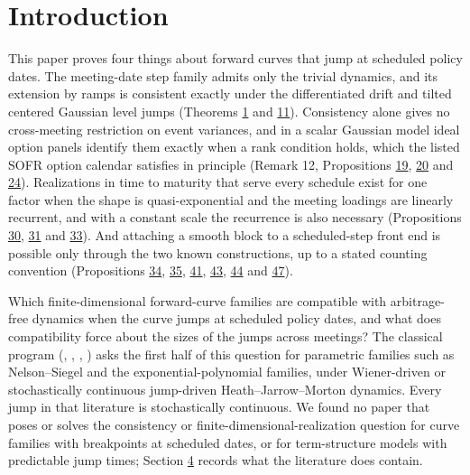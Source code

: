 \documentclass[11pt]{article}
\begin{document}
\section{Introduction}\label{sec:1}

This paper proves four things about forward curves that jump at scheduled policy dates. The meeting-date step family admits only the trivial dynamics, and its extension by ramps is consistent exactly under the differentiated drift and tilted centered Gaussian level jumps (Theorems \hyperref[res:Theorem-1]{1} and \hyperref[res:Theorem-11]{11}). Consistency alone gives no cross-meeting restriction on event variances, and in a scalar Gaussian model ideal option panels identify them exactly when a rank condition holds, which the listed SOFR option calendar satisfies in principle (Remark 12, Propositions \hyperref[res:Proposition-19]{19}, \hyperref[res:Proposition-20]{20} and \hyperref[res:Proposition-24]{24}). Realizations in time to maturity that serve every schedule exist for one factor when the shape is quasi-exponential and the meeting loadings are linearly recurrent, and with a constant scale the recurrence is also necessary (Propositions \hyperref[res:Proposition-30]{30}, \hyperref[res:Proposition-31]{31} and \hyperref[res:Proposition-33]{33}). And attaching a smooth block to a scheduled-step front end is possible only through the two known constructions, up to a stated counting convention (Propositions \hyperref[res:Proposition-34]{34}, \hyperref[res:Proposition-35]{35}, \hyperref[res:Proposition-41]{41}, \hyperref[res:Proposition-43]{43}, \hyperref[res:Proposition-44]{44} and \hyperref[res:Proposition-47]{47}).

Which finite-dimensional forward-curve families are compatible with arbitrage-free dynamics when the curve jumps at scheduled policy dates, and what does compatibility force about the sizes of the jumps across meetings? The classical program (\cite{bjork1999interest}, \cite{filipovic1999note}, \cite{filipovic2000exponential}, \cite{filipovic2001consistency}) asks the first half of this question for parametric families such as Nelson--Siegel and the exponential-polynomial families, under Wiener-driven or stochastically continuous jump-driven Heath--Jarrow--Morton dynamics. Every jump in that literature is stochastically continuous. We found no paper that poses or solves the consistency or finite-dimensional-realization question for curve families with breakpoints at scheduled dates, or for term-structure models with predictable jump times; Section \hyperref[sec:4]{4} records what the literature does contain.
\end{document}
